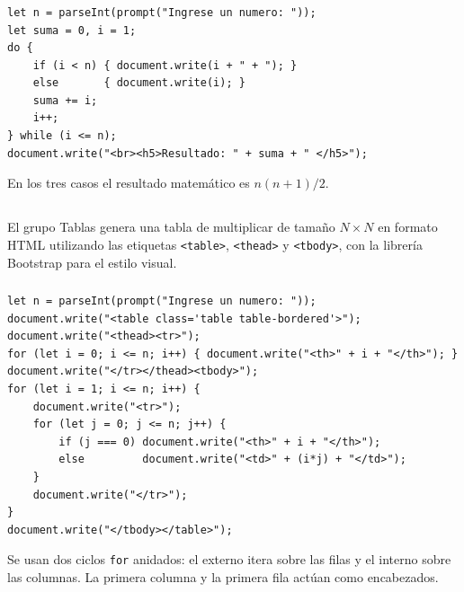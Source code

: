 \documentclass[10pt,a4paper]{article}
\begin{document}
\subsubsection{}

\begin{lstlisting}[style=jsStyle, caption={Suma con do-while}]
let n = parseInt(prompt("Ingrese un numero: "));
let suma = 0, i = 1;
do {
    if (i < n) { document.write(i + " + "); }
    else       { document.write(i); }
    suma += i;
    i++;
} while (i <= n);
document.write("<br><h5>Resultado: " + suma + " </h5>");
\end{lstlisting}

En los tres casos el resultado matemático es $n(n+1)/2$.

\subsection{\color{colorESCOM}{Grupo: Tablas}}

El grupo Tablas genera una tabla de multiplicar de tamaño $N \times N$ en formato HTML utilizando las etiquetas \texttt{<table>}, \texttt{<thead>} y \texttt{<tbody>}, con la librería Bootstrap para el estilo visual.

\subsubsection{}

\begin{lstlisting}[style=jsStyle, caption={Tabla N x N con for}]
let n = parseInt(prompt("Ingrese un numero: "));
document.write("<table class='table table-bordered'>");
document.write("<thead><tr>");
for (let i = 0; i <= n; i++) { document.write("<th>" + i + "</th>"); }
document.write("</tr></thead><tbody>");
for (let i = 1; i <= n; i++) {
    document.write("<tr>");
    for (let j = 0; j <= n; j++) {
        if (j === 0) document.write("<th>" + i + "</th>");
        else         document.write("<td>" + (i*j) + "</td>");
    }
    document.write("</tr>");
}
document.write("</tbody></table>");
\end{lstlisting}

Se usan dos ciclos \texttt{for} anidados: el externo itera sobre las filas y el interno sobre las columnas. La primera columna y la primera fila actúan como encabezados.
\end{document}
